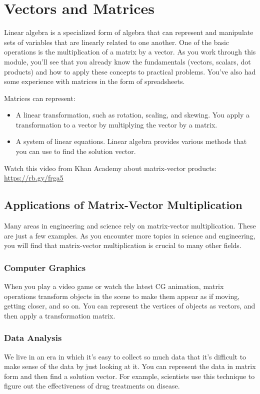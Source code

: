 \chapter{Vectors and Matrices}
Linear algebra is a specialized form of algebra that can represent and manipulate sets of variables that are linearly related to one another. One of the basic operations is the multiplication of a matrix by a vector. As you work through this module, you’ll see that you already know the fundamentals (vectors, scalars, dot products) and how to apply these concepts to practical problems. You’ve also had some experience with matrices in the form of spreadsheets. 

Matrices can represent:
\begin{itemize}
\item A linear transformation, such as rotation, scaling, and skewing. You apply a transformation to a vector by multiplying the vector by a matrix.  
\item A system of linear equations. Linear algebra provides various methods that you can use to find the solution vector. 
\end{itemize}

Watch this video from Khan Academy about matrix-vector products: \url{https://rb.gy/frga5}

\section{Applications of Matrix-Vector Multiplication}
Many areas in engineering and science rely on matrix-vector multiplication. These are just a few examples. As you encounter more topics in science and engineering, you will find that matrix-vector multiplication is crucial to many other fields.

\subsection{Computer Graphics}
When you play a video game or watch the latest CG animation, matrix operations transform objects in the scene to make them appear as if moving, getting closer, and so on. You can represent the vertices of objects as vectors, and then apply a transformation matrix.

\subsection{Data Analysis}
We live in an era in which it's easy to collect so much data that it's difficult to make sense of the data by just looking at it. You can represent the data in matrix form and then find a solution vector. For example, scientists use this technique to figure out the effectiveness of drug treatments on disease.

